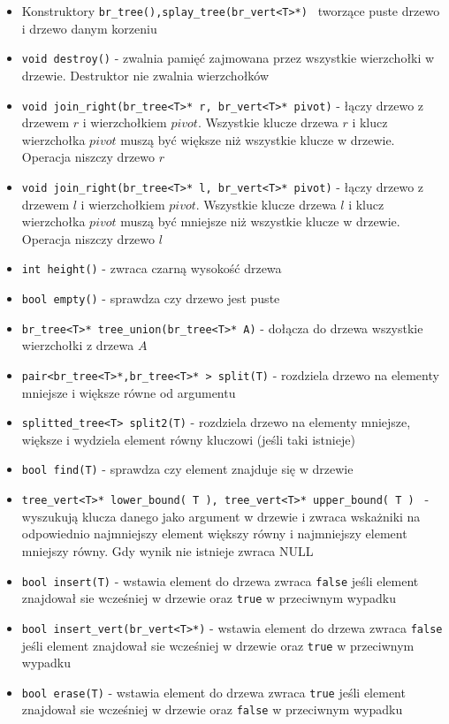 \documentclass[declaration,shortabstract]{iithesis}
\theoremstyle{thm}
\theoremstyle{remark}
\theoremstyle{plain}
\theoremstyle{plain}
\theoremstyle{plain}
\begin{document}
\begin{itemize}

\item{Konstruktory \texttt{br\_tree(),splay\_tree(br\_vert<T>*) } tworzące puste drzewo i drzewo danym korzeniu }

\item{\texttt{void destroy()} - zwalnia pamięć zajmowana przez wszystkie wierzchołki w drzewie. Destruktor nie zwalnia wierzchołków}

\item{\texttt{void join\_right(br\_tree<T>* r, br\_vert<T>* pivot)} - łączy drzewo z drzewem $r$ i wierzchołkiem $pivot$. Wszystkie klucze drzewa $r$ i klucz wierzchołka $pivot$ muszą być większe niż wszystkie klucze w drzewie. Operacja niszczy drzewo $r$}

\item{\texttt{void join\_right(br\_tree<T>* l, br\_vert<T>* pivot)} - łączy drzewo z drzewem $l$ i wierzchołkiem $pivot$. Wszystkie klucze drzewa $l$ i klucz wierzchołka $pivot$ muszą być mniejsze niż wszystkie klucze w drzewie. Operacja niszczy drzewo $l$}

\item{\texttt{int height()} - zwraca czarną wysokość drzewa}
 
\item{\texttt{bool empty()} - sprawdza czy drzewo jest puste}

\item{\texttt{br\_tree<T>* tree\_union(br\_tree<T>* A)} - dołącza do drzewa wszystkie wierzchołki z drzewa $A$}

\item{\texttt{pair<br\_tree<T>*,br\_tree<T>* > split(T)} - rozdziela drzewo na elementy mniejsze i większe równe od argumentu}

\item{\texttt{splitted\_tree<T> split2(T)} - rozdziela drzewo na elementy mniejsze, większe i wydziela element równy kluczowi (jeśli taki istnieje)}

\item{\texttt{bool find(T)} - sprawdza czy element znajduje się w drzewie}
    
\item{\texttt{tree\_vert<T>* lower\_bound( T ), tree\_vert<T>* upper\_bound( T ) } - wyszukują klucza danego jako argument w drzewie i zwraca wskażniki na odpowiednio najmniejszy element większy równy i najmniejszy element mniejszy równy. Gdy wynik nie istnieje zwraca NULL }
   
\item{\texttt{bool insert(T)} - wstawia element do drzewa zwraca \texttt{false} jeśli element znajdował sie wcześniej w drzewie oraz \texttt{true} w przeciwnym wypadku}
\item{\texttt{bool insert\_vert(br\_vert<T>*)} - wstawia element do drzewa zwraca \texttt{false} jeśli element znajdował sie wcześniej w drzewie oraz \texttt{true} w przeciwnym wypadku}
\item{\texttt{bool erase(T)} - wstawia element do drzewa zwraca \texttt{true} jeśli element znajdował sie wcześniej w drzewie oraz \texttt{false} w przeciwnym wypadku}

\end{itemize}
\end{document}
